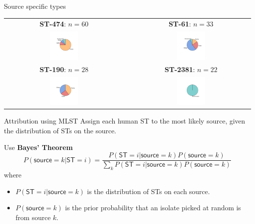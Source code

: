 \documentclass[]{beamer}
\begin{document}
\begin{frame}{Source specific types}
\begin{center}
\begin{tabular}{cp{2cm}c}
\textbf{ST-474}: $n=60$ & & \textbf{ST-61}: $n=3$3\\
\includegraphics[width=0.25\textwidth,trim=80 60 80 60]{Pictures/474.pdf}
& &
\includegraphics[width=0.25\textwidth,trim=80 60 80 60]{Pictures/61.pdf}\\
\textbf{ST-190}: $n=28$ & & \textbf{ST-2381}: $n=22$\\
\includegraphics[width=0.25\textwidth,trim=80 40 80 60]{Pictures/190.pdf}
& &
\includegraphics[width=0.25\textwidth,trim=80 40 80 60]{Pictures/2381.pdf}\\\end{tabular}
\end{center}
\end{frame}

\begin{frame}{Attribution using MLST}
Assign each human ST to the most likely source, given the distribution of STs on the source.

Use {\bf Bayes' Theorem}
\[
P(\mathsf{source}=k | \mathsf{ST}=i) = \frac{P(\mathsf{ST}=i|\mathsf{source}=k)P(\mathsf{source}=k)}{\sum_k P(\mathsf{ST}=i|\mathsf{source}=k)P(\mathsf{source}=k)}
\]
where
\begin{itemize}
\item $P(\mathsf{ST}=i|\mathsf{source}=k)$ is the distribution of STs on each source.
\gap
\item $P(\mathsf{source}=k)$ is the prior probability that an isolate picked at random is from source $k$.
\end{itemize}
\end{frame}
\end{document}
